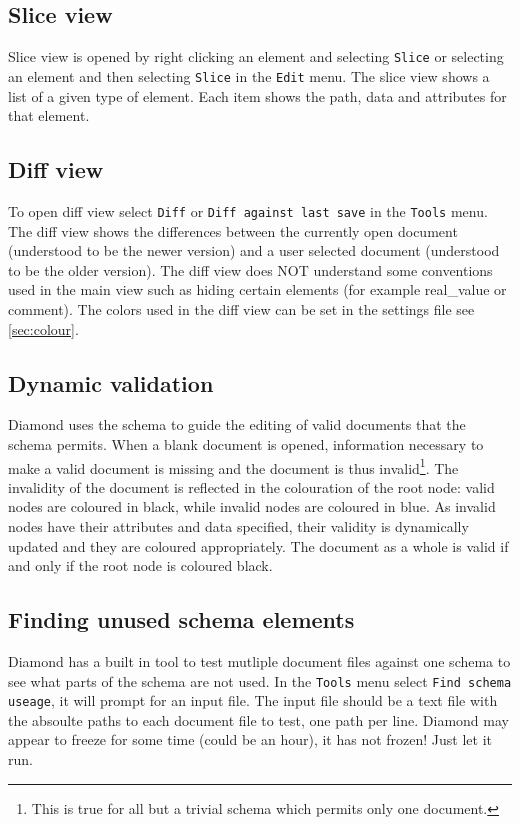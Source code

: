 \subsection{Slice view}
Slice view is opened by right clicking an element and selecting \verb+Slice+ or 
selecting an element and then selecting \verb+Slice+ in the \verb+Edit+ menu. 
The slice view shows a list of a given type of element. Each item shows the path, data and attributes for that element.

\subsection{Diff view}
To open diff view select \verb+Diff+ or \verb+Diff against last save+ in the \verb+Tools+ menu.
The diff view shows the differences between the currently open document (understood to be the newer version)
and a user selected document (understood to be the older version). The diff view does NOT understand some conventions
used in the main view such as hiding certain elements (for example real\_value or comment).
The colors used in the diff view can be set in the settings file see \ref{sec:colour}.

\subsection{Dynamic validation}
Diamond uses the schema to guide the editing of valid documents that the schema 
permits. When a blank document is opened, information necessary to make a valid
document is missing and the document is thus invalid\footnote{This is true for all
but a trivial schema which permits only one document.}. The invalidity of the document
is reflected in the colouration of the root node: valid nodes are coloured in black,
while invalid nodes are coloured in blue. As invalid nodes have their attributes
and data specified, their validity is dynamically updated and they are coloured appropriately.
The document as a whole is valid if and only if the root node is coloured black.

\subsection{Finding unused schema elements}
Diamond has a built in tool to test mutliple document files against one schema to see what parts of the schema are not used.
In the \verb+Tools+ menu select \verb+Find schema useage+, it will prompt for an input file. The input file should be a text file
with the absoulte paths to each document file to test, one path per line.
Diamond may appear to freeze for some time (could be an hour), it has not frozen! Just let it run.
